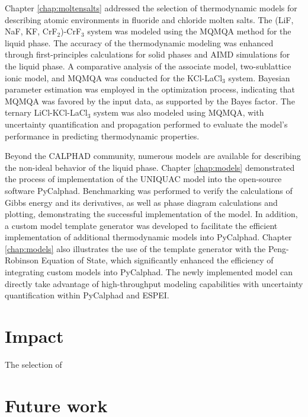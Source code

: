 Chapter \ref{chap:moltensalts} addressed the selection of thermodynamic models for describing atomic environments in fluoride and chloride molten salts. The (LiF, NaF, KF, CrF${_2}$)-CrF${_3}$ system was modeled using the MQMQA method for the liquid phase. The accuracy of the thermodynamic modeling was enhanced through first-principles calculations for solid phases and AIMD simulations for the liquid phase. A comparative analysis of the associate model, two-sublattice ionic model, and MQMQA was conducted for the KCl-LaCl${_3}$ system. Bayesian parameter estimation was employed in the optimization process, indicating that MQMQA was favored by the input data, as supported by the Bayes factor. The ternary LiCl-KCl-LaCl${_3}$ system was also modeled using MQMQA, with uncertainty quantification and propagation performed to evaluate the model's performance in predicting thermodynamic properties.

Beyond the CALPHAD community, numerous models are available for describing the non-ideal behavior of the liquid phase.  Chapter \ref{chap:models} demonstrated the process of implementation of the UNIQUAC model into the open-source software PyCalphad. Benchmarking was performed to verify the calculations of Gibbs energy and its derivatives, as well as phase diagram calculations and plotting, demonstrating the successful implementation of the model. In addition, a custom model template generator was developed to facilitate the efficient implementation of additional thermodynamic models into PyCalphad. Chapter \ref{chap:models} also illustrates the use of the template generator with the Peng-Robinson Equation of State, which significantly enhanced the efficiency of integrating custom models into PyCalphad. The newly implemented model can directly take advantage of high-throughput modeling capabilities with uncertainty quantification within PyCalphad and ESPEI.

\section{Impact} \label{conclusion:sec:impact}
The selection of 


\section{Future work} \label{conclusion:sec:future}
